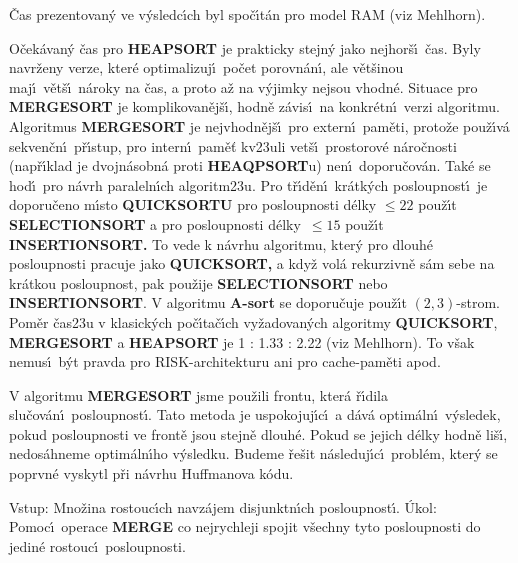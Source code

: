 \flushpar\v Cas prezentovan\'y ve v\'ysledc\'\i ch byl spo\v c\'\i t\'an 
pro model RAM (viz Mehlhorn).
\medskip

\flushpar O\v cek\'avan\'y \v cas pro {\bf HEAPSORT} je prakticky stejn\'y jako 
nej\-hor\v s\'\i\ \v cas.  Byly navr\v zeny verze, kter\'e optimalizuj\'\i\ 
po\v cet porov\-n\'an\'\i , ale v\v et\v sinou maj\'\i\ v\v et\v s\'\i\ n\'aroky na 
\v cas, a proto a\v z na v\'yjimky ne\-jsou vhodn\'e.  
Situace pro {\bf MERGESORT} je komplikovan\v ej\v s\'\i , hod\-n\v e z\'avis\'\i\ 
na konkr\'etn\'\i\ verzi algoritmu.  Algoritmus 
{\bf MER\-GE\-SORT} je nejvhodn\v ej\v s\'\i\ pro extern\'\i\ pam\v eti, proto\v ze 
pou\v z\'\i v\'a sekven\v cn\'\i\ p\v r\'\i stup, pro intern\'\i\ pam\v e\v t 
kv\accent23uli vet\v s\'\i\ prostorov\'e n\'aro\v cnosti (nap\v r\'\i klad je dvojn\'asobn\'a 
proti {\bf HEAQPSORT}u) nen\'\i\ doporu\v cov\'an.  Tak\'e se hod\'\i\ pro 
n\'avrh pa\-ra\-leln\'\i ch algoritm\accent23u. Pro t\v r\'\i d\v en\'\i\ 
kr\'atk\'ych posloupnost\'\i\ je doporu\v ceno m\'\i sto {\bf QUICKSORTU }
pro posloupnosti d\'elky $\le 22$ pou\v z\'\i t {\bf SELECTIONSORT} a pro 
posloupnosti d\'elky $\,\le 15$ pou\v z\'\i t {\bf INSERTIONSORT.}
To vede k n\'avrhu algoritmu, kter\'y 
pro dlouh\'e posloupnosti pracuje jako {\bf QUICKSORT,} a kdy\v z 
vol\'a rekurzivn\v e s\'am sebe na kr\'atkou posloupnost, pak 
pou\v zije {\bf SELECTIONSORT} ne\-bo {\bf INSERTIONSORT}. V algoritmu {\bf A-sort }
se doporu\-\v cu\-je pou\v z\'\i t $\left(2,3\right)$-strom.  
Pom\v er \v cas\accent23u v klasick\'ych po\v c\'\i ta\v c\'\i ch vy\v zadovan\'ych algoritmy {\bf QUICKSORT}, 
{\bf MERGESORT} a {\bf HEAPSORT} je 1 : 1.33 : 2.22 (viz Mehlhorn). To v\v sak nemus\'\i\ 
b\'yt pravda pro RISK-architekturu ani pro cache-pam\v eti 
apod. 
\medskip

\flushpar V algoritmu {\bf MERGESORT} jsme pou\v zili frontu, 
kter\'a \v r\'\i dila slu\v cov\'an\'\i\ posloupnost\'\i . Tato metoda je 
uspokojuj\'\i c\'\i\ a d\'av\'a optim\'aln\'\i\ v\'ysledek, pokud 
posloupnosti ve front\v e jsou stejn\v e dlouh\'e. Pokud se 
jejich d\'elky hodn\v e li\v s\'\i , nedos\'ahneme 
optim\'aln\'\i ho v\'ysledku. Budeme \v re\v sit n\'asleduj\'\i c\'\i\ 
probl\'em, kter\'y se poprvn\'e vyskytl p\v ri n\'avrhu Huffmanova k\'odu. 
\bigskip

\flushpar Vstup: Mno\v zina rostouc\'\i ch navz\'ajem 
disjunktn\'\i ch posloupnost\'\i .\newline 
\'Ukol:  Pomoc\'\i\ operace {\bf MERGE} co nejrychleji spojit 
v\v sechny tyto posloupnosti do jedin\'e rostouc\'\i\ posloupnosti.  
\medskip

